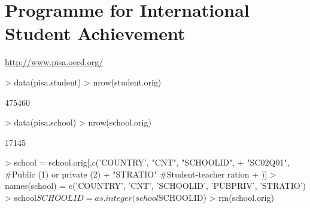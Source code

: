 \documentclass[letterpaper,11pt]{article}
\begin{document}
\section{Programme for International Student Achievement}

\url{http://www.pisa.oecd.org/}

\begin{Schunk}
\begin{Sinput}
> data(pisa.student)
> nrow(student.orig)
\end{Sinput}
\begin{Soutput}
[1] 475460
\end{Soutput}
\begin{Sinput}
> data(pisa.school)
> nrow(school.orig)
\end{Sinput}
\begin{Soutput}
[1] 17145
\end{Soutput}
\end{Schunk}


\begin{Schunk}
\begin{Sinput}
> school = school.orig[,c('COUNTRY', "CNT", "SCHOOLID",
+ 	"SC02Q01", #Public (1) or private (2)
+ 	"STRATIO" #Student-teacher ration    
+ )]
> names(school) = c('COUNTRY', 'CNT', 'SCHOOLID', 'PUBPRIV', 'STRATIO')
> school$SCHOOLID = as.integer(school$SCHOOLID)
> rm(school.orig)
\end{Sinput}
\end{Schunk}
\end{document}
